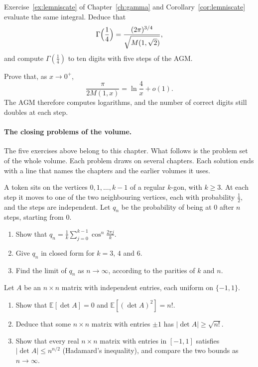 \begin{exercise}[$\star\star$]\label{ex:gamma14}
Exercise~\ref{ex:lemniscate} of Chapter~\ref{ch:gamma} and Corollary~\ref{cor:lemniscate} evaluate the same integral. Deduce that
\[
\Gamma\Bigl(\frac14\Bigr)=\frac{(2\pi)^{3/4}}{\sqrt{M(1,\sqrt2)}},
\]
and compute $\Gamma(\frac14)$ to ten digits with five steps of the AGM.
\end{exercise}

\begin{exercise}[$\star\star\star$]\label{ex:agmlog}
Prove that, as $x\to0^+$,
\[
\frac\pi{2M(1,x)}=\ln\frac4x+o(1).
\]
The AGM therefore computes logarithms, and the number of correct digits still doubles at each step.
\end{exercise}

\paragraph{The closing problems of the volume.} The five exercises above belong to this chapter. What follows is the problem set of the whole volume. Each problem draws on several chapters. Each solution ends with a line that names the chapters and the earlier volumes it uses.

\begin{exercise}[$\star$]\label{pb:cyclewalk}
A token sits on the vertices $0,1,\dots,k-1$ of a regular $k$-gon, with $k\ge3$. At each step it moves to one of the two neighbouring vertices, each with probability $\frac12$, and the steps are independent. Let $q_n$ be the probability of being at $0$ after $n$ steps, starting from $0$.
\begin{enumerate}[label=(\alph*)]
\item Show that $q_n=\frac1k\sum_{j=0}^{k-1}\cos^n\frac{2\pi j}k$.
\item Give $q_n$ in closed form for $k=3$, $4$ and $6$.
\item Find the limit of $q_n$ as $n\to\infty$, according to the parities of $k$ and $n$.
\end{enumerate}
\end{exercise}

\begin{exercise}[$\star\star$]\label{pb:detsquare}
Let $A$ be an $n\times n$ matrix with independent entries, each uniform on $\{-1,1\}$.
\begin{enumerate}[label=(\alph*)]
\item Show that $\mathbb E[\det A]=0$ and $\mathbb E[(\det A)^2]=n!$.
\item Deduce that some $n\times n$ matrix with entries $\pm1$ has $|\det A|\ge\sqrt{n!}$.
\item Show that every real $n\times n$ matrix with entries in $[-1,1]$ satisfies $|\det A|\le n^{n/2}$ (Hadamard's
inequality), and compare the two bounds as $n\to\infty$.
\end{enumerate}
\end{exercise}

